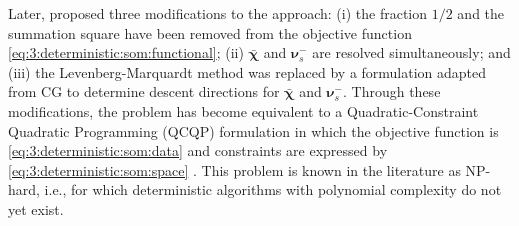 			Later, \cite{chen2010subspace} proposed three modifications to the approach: (i) the fraction $1/2$ and the summation square have been removed from the objective function \eqref{eq:3:deterministic:som:functional}; (ii) $\boldsymbol{\bar{\chi}}$ and $\boldsymbol{\nu}^-_s$ are resolved simultaneously; and (iii) the Levenberg-Marquardt method was replaced by a formulation adapted from CG to determine descent directions for $\boldsymbol{\bar{\chi}}$ and $\boldsymbol{\nu}^-_s$. Through these modifications, the problem has become equivalent to a Quadratic-Constraint Quadratic Programming (QCQP) formulation in which the objective function is \eqref{eq:3:deterministic:som:data} and constraints are expressed by \eqref{eq:3:deterministic:som:space} \citep{chen2017}. This problem is known in the literature as NP-hard, i.e., for which deterministic algorithms with polynomial complexity do not yet exist.
			
